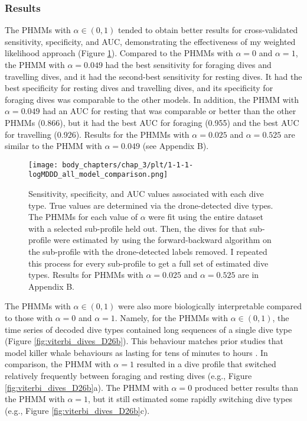 \subsubsection{Results}

The PHMMs with $\alpha \in (0,1)$ tended to obtain better results for cross-validated sensitivity, specificity, and AUC, demonstrating the effectiveness of my weighted likelihood approach (Figure \ref{fig:sens_spec}). Compared to the PHMMs with $\alpha = 0$ and $\alpha = 1$, the PHMM with $\alpha = 0.049$ had the best sensitivity for foraging dives and travelling dives, and it had the second-best sensitivity for resting dives. It had the best specificity for resting dives and travelling dives, and its specificity for foraging dives was comparable to the other models. In addition, the PHMM with $\alpha = 0.049$ had an AUC for resting that was comparable or better than the other PHMMs (0.866), but it had the best AUC for foraging (0.955) and the best AUC for travelling (0.926). Results for the PHMMs with $\alpha = 0.025$ and $\alpha = 0.525$ are similar to the PHMM with $\alpha = 0.049$ (see Appendix B). 

\begin{figure}
    \centering
    \texttt{[image: body\_chapters/chap\_3/plt/1-1-1-logMDDD\_all\_model\_comparison.png]}
    \caption[Sensitivity, specificity, and AUC values from case study 1 associated with each dive type for PHMMs with different values of $\alpha$.]{Sensitivity, specificity, and AUC values associated with each dive type. True values are determined via the drone-detected dive types. The PHMMs for each value of $\alpha$ were fit using the entire dataset with a selected sub-profile held out. Then, the dives for that sub-profile were estimated by using the forward-backward algorithm on the sub-profile with the drone-detected labels removed. I repeated this process for every sub-profile to get a full set of estimated dive types. Results for PHMMs with $\alpha = 0.025$ and $\alpha = 0.525$ are in Appendix B.}
    \label{fig:sens_spec}
\end{figure}

The PHMMs with $\alpha \in (0,1)$ were also more biologically interpretable compared to those with $\alpha = 0$ and $\alpha = 1$. Namely, for the PHMMs with $\alpha \in (0,1)$, the time series of decoded dive types contained long sequences of a single dive type (Figure \ref{fig:viterbi_dives_D26b}). This behaviour matches prior studies that model killer whale behaviours as lasting for tens of minutes to hours \citep{McRae:2024}. In comparison, the PHMM with $\alpha = 1$ resulted in a dive profile that switched relatively frequently between foraging and resting dives (e.g., Figure \ref{fig:viterbi_dives_D26b}a). The PHMM with $\alpha = 0$ produced better results than the PHMM with $\alpha = 1$, but it still estimated some rapidly switching dive types (e.g., Figure \ref{fig:viterbi_dives_D26b}c).

